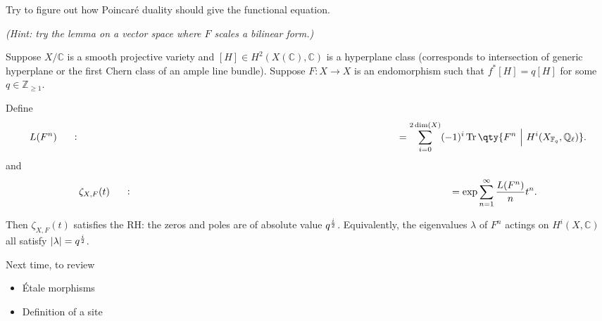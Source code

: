 \begin{exercise}

Try to figure out how Poincaré duality should give the functional
equation.

\emph{(Hint: try the lemma on a vector space where \(F\) scales a
bilinear form.)}

\end{exercise}

\begin{theorem}

Suppose \(X/{\mathbb{C}}\) is a smooth projective variety and
\([H] \in H^2(X({\mathbb{C}}), {\mathbb{C}})\) is a hyperplane class
(corresponds to intersection of generic hyperplane or the first Chern
class of an ample line bundle). Suppose \(F:X\to X\) is an endomorphism
such that \(f^*[H] = q[H]\) for some \(q\in {\mathbb{Z}}_{\geq 1}\).

Define
\begin{align*}  
L(F^n) \mathrel{\vcenter{:}}=
\sum_{i=0}^{2\dim(X)} (-1)^i \operatorname{Tr}\qty{ F^n {~\mathrel{\Big|}~}H^i(X_{{\mathbb{F}}_q}, {\mathbb{Q}}_\ell)}
.\end{align*}
and
\begin{align*}  
\zeta_{X, F}(t) \mathrel{\vcenter{:}}=
\exp{ \sum_{n=1}^\infty {L(F^n) \over n}t^n  }
.\end{align*}

Then \(\zeta_{X, F}(t)\) satisfies the RH: the zeros and poles are of
absolute value \(q^{i\over 2}\). Equivalently, the eigenvalues
\(\lambda\) of \(F^n\) actings on \(H^i(X, {\mathbb{C}})\) all satisfy
\({\left\lvert {\lambda} \right\rvert} = q^{i\over 2}\).

\end{theorem}

Next time, to review

\begin{itemize}
\tightlist
\item
  Étale morphisms
\item
  Definition of a site
\end{itemize}

\cleardoublepage

\renewcommand{\listtheoremname}{}
\listoftheorems[ignoreall,show={definition}, numwidth=3.5em]
\cleardoublepage

\renewcommand{\listtheoremname}{}
\listoftheorems[ignoreall,show={theorem,proposition}, numwidth=3.5em]
\cleardoublepage

\renewcommand{\listtheoremname}{}
\listoftheorems[ignoreall,show={exercise}, numwidth=3.5em]
\cleardoublepage

\listoffigures
\cleardoublepage


\printbibliography[title=Bibliography]



